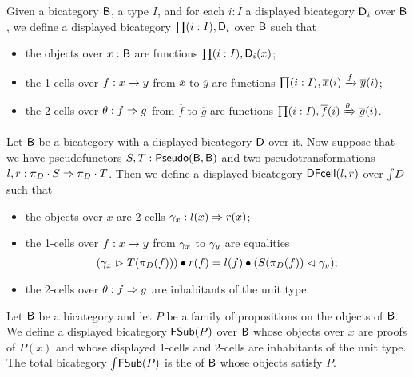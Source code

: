 \begin{example}
\label{ex:disp_depprod}
Given a bicategory $\B$, a type $I$, and for each $i : I$ a displayed bicategory $\D_i$ over $\B$,
we define a displayed bicategory $\depprod{(i : I)}{\D_i}$ over $\B$ such that
\begin{itemize}
	\item the objects over $x : \B$ are functions $\depprod{(i : I)}{\D_i(x)}$;
	\item the 1-cells over $f : x \onecell y$ from $\overline{x}$ to $\overline{y}$ are functions $\depprod{(i : I)}{\dmor{\overline{x}(i)}{\overline{y}(i)}{f}}$;
	\item the 2-cells over $\tc : f \twocell g$ from $\overline{f}$ to $\overline{g}$ are functions $\depprod{(i : I)}{\dtwo{\overline{f}(i)}{\overline{g}(i)}{\tc}}$.
\end{itemize}
\end{example}

\begin{example}
\label{ex:DCell}
Let $\B$ be a bicategory with a displayed bicategory $\D$ over it.
Now suppose that we have pseudofunctors $S, T : \pseudo(\B, \B)$ and two pseudotransformations $l, r : \pstrans{\dproj{D} \cdot S}{\dproj{D} \cdot T}$.
Then we define a displayed bicategory $\DCell(l,r)$ over $\total{D}$ such that
\begin{itemize}
	\item the objects over $x$ are 2-cells $\tcB_x : l(x) \twocell r(x)$;
	\item the 1-cells over $f : x \onecell y$ from $\tcB_x$ to $\tcB_y$ are equalities
	\[
	(\tcB_x \whiskerr T(\dproj{D}(f))) \vcomp r(f)
	=
	l(f) \vcomp (S(\dproj{D}(f)) \whiskerl \tcB_y);
	\]
	\item the 2-cells over $\tc : f \twocell g$ are inhabitants of the unit type.
\end{itemize}
\end{example}

\begin{example}
\label{ex:fullsub}
Let $\B$ be a bicategory and let $P$ be a family of propositions on the objects of $\B$.
We define a displayed bicategory $\FSub(P)$ over $\B$ whose objects over $x$ are proofs of $P(x)$
and whose displayed 1-cells and 2-cells are inhabitants of the unit type.
The total bicategory $\total{\FSub(P)}$ is the  of $\B$ whose objects satisfy $P$.
\end{example}
